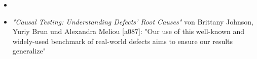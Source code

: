 \begin{itemize}
    \item %
    \item \textit{"Causal Testing: Understanding Defects’ Root Causes"} von Brittany Johnson, Yuriy Brun und Alexandra Meliou [a087]: "Our use of this well-known and widely-used benchmark of real-world defects aims to ensure our results generalize"
\end{itemize}
